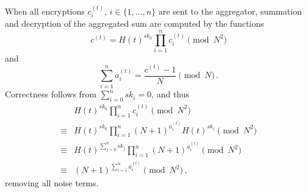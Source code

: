 When all encryptions $c^{(t)}_{i},\,i\in\{1,\dots,n\}$ are sent to the aggregator, summation and decryption of the aggregated sum are computed by the functions
\begin{equation}
    c^{(t)} = H(t)^{sk_0}\prod^{n}_{i=1}c^{(t)}_{i} \pmod{N^2} \label{eqn:agg_summation}
\end{equation}
and
\begin{equation}
    \sum^{n}_{i=1}a^{(t)}_{i} = \frac{c^{(t)}-1}{N} \pmod{N}\,. \label{eqn:agg_decryption}
\end{equation}
Correctness follows from $\sum^{n}_{i=0}sk_i = 0$, and thus
\begin{equation*}
    \begin{split}
        &H(t)^{sk_0}\prod^{n}_{i=1}c^{(t)}_{i} \pmod{N^2} \\
        \equiv &H(t)^{sk_0}\prod^{n}_{i=1}(N+1)^{a^{(t)}_{i}} H(t)^{sk_i} \pmod{N^2} \\
        \equiv &H(t)^{\sum^n_{j=0}sk_j} \prod^{n}_{i=1}(N+1)^{a^{(t)}_{i}} \pmod{N^2} \\
        \equiv &(N+1)^{\sum^n_{i=1}a^{(t)}_{i}} \pmod{N^2}\,,
    \end{split}
\end{equation*}
removing all noise terms.

% 
% 

